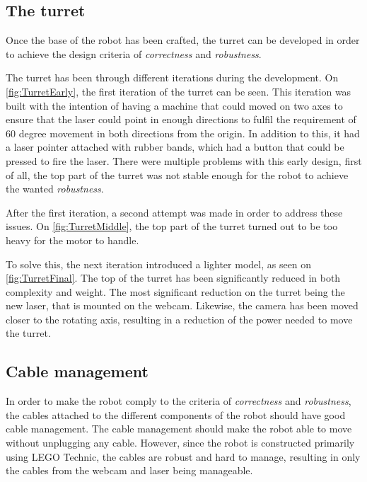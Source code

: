 \subsection{The turret}
Once the base of the robot has been crafted, the turret can be developed in order to achieve the design criteria of \textit{correctness} and \textit{robustness}. 

The turret has been through different iterations during the development. 
On \autoref{fig:TurretEarly}, the first iteration of the turret can be seen.
This iteration was built with the intention of having a machine that could moved on two axes to ensure that the laser could point in enough directions to fulfil the requirement of 60 degree movement in both directions from the origin.
In addition to this, it had a laser pointer attached with rubber bands, which had a button that could be pressed to fire the laser.
There were multiple problems with this early design, first of all, the top part of the turret was not stable enough for the robot to achieve the wanted \textit{robustness}.

After the first iteration, a second attempt was made in order to address these issues. 
On \autoref{fig:TurretMiddle}, the top part of the turret turned out to be too heavy for the motor to handle. 

To solve this, the next iteration introduced a lighter model, as seen on \autoref{fig:TurretFinal}.
The top of the turret has been significantly reduced in both complexity and weight. 
The most significant reduction on the turret being the new laser, that is mounted on the webcam.
Likewise, the camera has been moved closer to the rotating axis, resulting in a reduction of the power needed to move the turret. 

\subsection{Cable management}
In order to make the robot comply to the criteria of \textit{correctness} and \textit{robustness}, the cables attached to the different components of the robot should have good cable management. 
The cable management should make the robot able to move without unplugging any cable.
However, since the robot is constructed primarily using LEGO Technic, the cables are robust and hard to manage, resulting in only the cables from the webcam and laser being manageable. 

